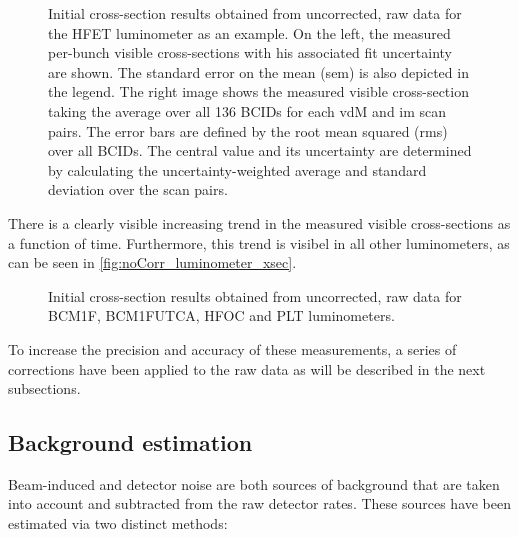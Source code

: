 \begin{figure}[!htb]
	\centering
	\caption[Initial HFET cross-section results]{Initial cross-section results obtained from uncorrected, raw data for the HFET luminometer as an example. On the left, the measured per-bunch visible cross-sections with his associated fit uncertainty are shown. The standard error on the mean (sem) is also depicted in the legend. The right image shows the measured visible cross-section taking the average over all 136 BCIDs for each vdM and im scan pairs. The error bars are defined by the root mean squared (rms) over all BCIDs. The central value and its uncertainty are determined by calculating the uncertainty-weighted average and  standard deviation over the scan pairs.}
	\label{fig:no_Corr_xsec_results_HFET}
\end{figure}

There is a clearly visible increasing trend in the measured visible cross-sections as a function of time. Furthermore, this trend is visibel in all other luminometers, as can be seen in \autoref{fig:noCorr_luminometer_xsec}.

\begin{figure}[!htb]
	\centering
	\caption[Initial cross-section for other online luminometers]{Initial cross-section results obtained from uncorrected, raw data for BCM1F, BCM1FUTCA, HFOC and PLT luminometers.}
	\label{fig:noCorr_luminometer_xsec}
\end{figure}

To increase the precision and accuracy of these measurements, a series of corrections have been applied to the raw data as will be described in the next subsections.

\subsection{Background estimation}

Beam-induced and detector noise are both sources of background that are taken into account and subtracted from the raw detector rates. These sources have been estimated via two distinct methods:

